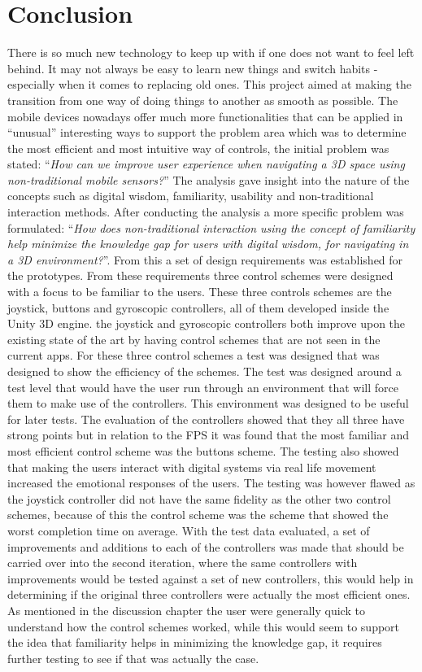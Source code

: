 \chapter{Conclusion}
There is so much new technology to keep up with if one does not want to feel left behind. It may not always be easy to learn new things and switch habits - especially when it comes to replacing old ones. This project aimed at making the transition from one way of doing things to another as smooth as possible. The mobile devices nowadays offer much more functionalities that can be applied in “unusual” interesting ways to support the problem area which was to determine the most efficient and most intuitive way of controls, the initial problem was stated: “\textit{How can we improve user experience when navigating a 3D space using non-traditional mobile sensors?}”
The analysis gave insight into the nature of the concepts such as digital wisdom, familiarity, usability and non-traditional interaction methods. After conducting the analysis  a  more specific problem was formulated: “\textit{How does non-traditional interaction using the concept of familiarity help minimize the knowledge gap for users with digital wisdom, for navigating in a 3D environment?}”. From this a set of design requirements was established for the prototypes. From these requirements three control schemes were designed with a focus to be familiar to the users. These three controls schemes are the joystick, buttons and gyroscopic controllers, all of them developed inside the Unity 3D engine. the joystick and gyroscopic controllers both improve upon the existing state of the art by having control schemes that are not seen in the current apps.
For these three control schemes a test was designed that was designed to show the efficiency of the schemes. The test was designed around a test level that would have the user run through an environment that will force them to make use of the controllers. This environment was designed to be useful for later tests. The evaluation of the controllers showed that they all three have strong points but in relation to the FPS it was found that the most familiar and most efficient control scheme was the buttons scheme. The testing also showed that making the users interact with digital systems via real life movement increased the emotional responses of the users. The testing was however flawed as the joystick controller did not have the same fidelity as the other two control schemes, because of this the control scheme was the scheme that showed the worst completion time on average. With the test data evaluated, a set of improvements and additions to each of the controllers was made that should be carried over into the second iteration, where the same controllers with improvements would be tested against a set of new controllers, this would help in determining if the original three controllers were actually the most efficient ones. As mentioned in the discussion chapter the user were generally quick to understand how the control schemes worked, while this would seem to support the idea that familiarity helps in minimizing the knowledge gap, it requires further testing to see if that was actually the case.